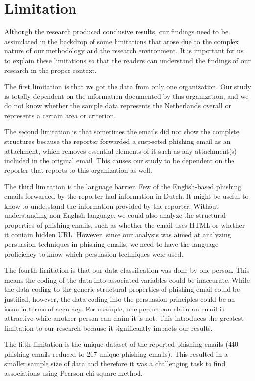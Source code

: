 \section{\label{sec:Limitation}Limitation}

Although the research produced conclusive results, our findings need
to be assimilated in the backdrop of some limitations that arose due
to the complex nature of our methodology and the research environment.
It is important for us to explain these limitations so that the readers
can understand the findings of our research in the proper context. 

The first limitation is that we got the data from only one organization.
Our study is totally dependent on the information documented by this
organization, and we do not know whether the sample data represents
the Netherlands overall or represents a certain area or criterion. 

The second limitation is that sometimes the emails did not show the
complete structures because the reporter forwarded a suspected phishing
email as an attachment, which removes essential elements of it such
as any attachment(s) included in the original email. This causes our
study to be dependent on the reporter that reports to this organization
as well. 

The third limitation is the language barrier. Few of the English-based
phishing emails forwarded by the reporter had information in Dutch.
It might be useful to know to understand the information provided
by the reporter. Without understanding non-English language, we could
also analyze the structural properties of phishing emails, such as
whether the email uses HTML or whether it contain hidden URL. However,
since our analysis was aimed at analyzing persuasion techniques in
phishing emails, we need to have the language proficiency to know
which persuasion techniques were used. 

The fourth limitation is that our data classification was done by
one person. This means the coding of the data into associated variables
could be inaccurate. While the data coding to the generic structural
properties of phishing email could be justified, however, the data
coding into the persuasion principles could be an issue in terms of
accuracy. For example, one person can claim an email is attractive
while another person can claim it is not. This introduces the greatest
limitation to our research because it significantly impacts our results. 

The fifth limitation is the unique dataset of the reported phishing
emails (440 phishing emails reduced to 207 unique phishing emails).
This resulted in a smaller sample size of data and therefore it was
a challenging task to find associations using Pearson chi-square method.



